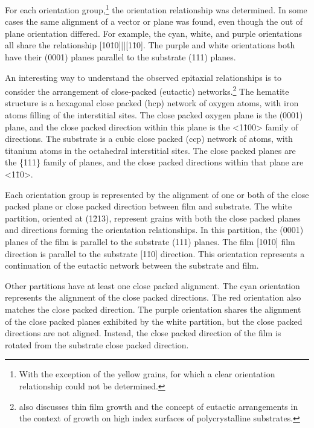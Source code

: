 For each orientation group,\footnote{With the exception of the yellow grains, for which a
clear orientation relationship could not be determined.} the orientation relationship was
determined. In some cases the same alignment of a vector or plane was found, even though
the out of plane orientation differed. For example, the cyan, white, and purple
orientations all share the relationship [10\={1}0]||[1\={1}0]. The
purple and white orientations both have their (0001) planes parallel to the substrate
(111) planes.

An interesting way to understand the observed epitaxial relationships is to consider the
arrangement of close-packed (eutactic)\cite{OKeeffe:1977vx}
networks.\footnote{ also discusses  thin film
growth and the concept of eutactic arrangements in the context of growth on high index
surfaces of polycrystalline substrates.} The hematite structure is a hexagonal close
packed (hcp) network of oxygen atoms, with iron atoms filling  of the
interstitial sites. The close packed oxygen plane is the (0001) plane, and the close
packed direction within this plane is the <1\={1}00> family of directions. The 
substrate is a cubic close packed (ccp) network of  atoms, with titanium atoms in
 the octahedral interstitial sites. The close packed planes are the
\{111\} family of planes, and the close packed directions within that plane are <1\={1}0>.


Each orientation group is represented by the alignment of one or both of the close packed
plane or close packed direction between film and substrate. The white partition, oriented
at (1\={2}13), represent grains with both the close packed planes and directions forming
the orientation relationships. In this partition, the  (0001) planes of the film is
parallel to the substrate (111) planes. The film [10\={1}0] film direction is parallel to
the substrate [1\={1}0] direction. This orientation represents a continuation of the
eutactic network between the substrate and film.

Other partitions have at least one close packed alignment. The cyan orientation represents
the alignment of the close packed directions. The red orientation also matches the close
packed direction. The purple orientation shares the alignment of the close packed planes
exhibited by the white partition, but the close packed directions are not aligned.
Instead, the close packed direction of the film is rotated \degree{} from
the substrate close packed direction.

